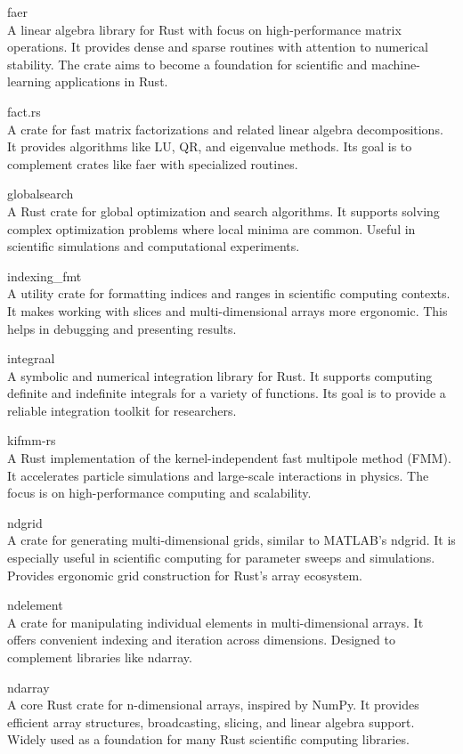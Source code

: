 \documentclass{article}
\begin{document}
faer\\
A linear algebra library for Rust with focus on high-performance matrix operations. It
provides dense and sparse routines with attention to numerical stability. The crate aims to become
a foundation for scientific and machine-learning applications in Rust.

fact.rs\\
A crate for fast matrix factorizations and related linear algebra decompositions. It
provides algorithms like LU, QR, and eigenvalue methods. Its goal is to complement crates like faer
with specialized routines.

globalsearch\\
A Rust crate for global optimization and search algorithms. It supports solving
complex optimization problems where local minima are common. Useful in scientific simulations and
computational experiments.

indexing\_fmt\\
A utility crate for formatting indices and ranges in scientific computing contexts.
It makes working with slices and multi-dimensional arrays more ergonomic. This helps in debugging
and presenting results.

integraal\\
A symbolic and numerical integration library for Rust. It supports computing definite
and indefinite integrals for a variety of functions. Its goal is to provide a reliable integration
toolkit for researchers.

kifmm-rs\\
A Rust implementation of the kernel-independent fast multipole method (FMM). It
accelerates particle simulations and large-scale interactions in physics. The focus is on
high-performance computing and scalability.

ndgrid\\
A crate for generating multi-dimensional grids, similar to MATLAB’s ndgrid. It is
especially useful in scientific computing for parameter sweeps and simulations. Provides ergonomic
grid construction for Rust’s array ecosystem.

ndelement\\
A crate for manipulating individual elements in multi-dimensional arrays. It offers
convenient indexing and iteration across dimensions. Designed to complement libraries like ndarray.

ndarray\\
A core Rust crate for n-dimensional arrays, inspired by NumPy. It provides efficient
array structures, broadcasting, slicing, and linear algebra support. Widely used as a foundation
for many Rust scientific computing libraries.
\end{document}
